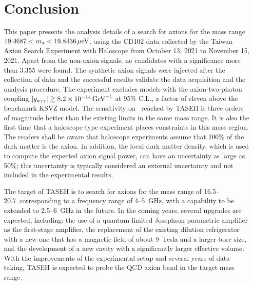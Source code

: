 \section{Conclusion} \label{sec:conclusion}
This paper presents the analysis details of a search for axions for the mass 
range $19.4687 < m_a < 19.8436 \,\mu\text{e\hspace{-.08em}V}$, using the CD102 data collected by the 
Taiwan Axion Search Experiment with Haloscope from October 13, 2021 
to November 15, 2021. 
Apart from the non-axion signals, no candidates with a significance more than
3.355 were found. The synthetic 
axion signals were injected after the collection of data and the 
successful results validate the data acquisition and the analysis procedure. 
The experiment excludes models with the 
axion-two-photon coupling $\left|g_{a\gamma\gamma}\right|\gtrsim 8.2\times 10^{-14}\,\text{Ge\hspace{-.08em}V}^{-1}$ at 95\% C.L.,
 a factor of eleven 
above the benchmark KSVZ model. The sensitivity on \gagg\ reached by TASEH 
is three orders of magnitude better than the existing limits in the same 
mass range.  
It is also the first time that a haloscope-type experiment places 
constraints in this mass region. The readers shall be aware that haloscope 
experiments assume 
that 100\% of the dark matter is the axion. In addition, the local dark 
matter density, which is used to compute the expected axion signal power, 
can have an uncertainty as large as 50\%; this uncertainty 
is typically considered an external 
uncertainty and not included in the experimental results. 

The target of TASEH is to search for axions for the mass range of 
16.5--20.7\muevcc\ corresponding to a frequency range of 4--5~GHz, with a 
capability to be extended to 2.5--6~GHz in the future. 
In the coming years, several upgrades are expected, including: the use of a 
quantum-limited Josephson parametric amplifier as the first-stage amplifier, 
the replacement of the existing dilution refrigerator with a new one that has 
a magnetic field of about 9~Tesla and a larger bore size, and the development 
of a new cavity with a significantly larger effective volume. 
With the improvements of the experimental setup and several years of data 
taking, TASEH is expected to probe the QCD axion band in the target mass range.


